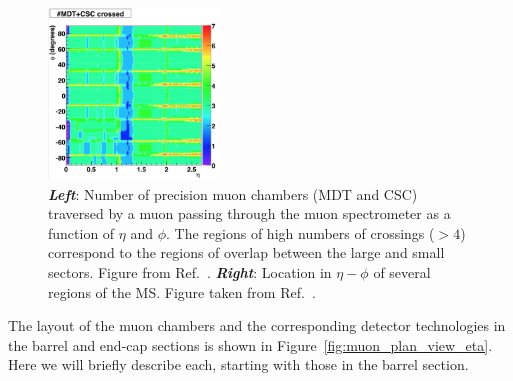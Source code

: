 \begin{figure}[!htb]
    \begin{center}
        \includegraphics[width=0.4\textwidth]{figures/chapter2/muon_spec/atlas_ms_nchamber_crossed}
        \caption{
            \textbf{\textit{Left}}: Number of precision muon chambers (MDT and CSC) traversed by a muon passing through the muon
                spectrometer as a function of $\eta$ and $\phi$.
                The regions of high numbers of crossings ($>4$) correspond to the regions of overlap
                between the large and small sectors.
                Figure from Ref.~\cite{ATL-PHYS-PUB-2009-008}.
            \textbf{\textit{Right}}: Location in $\eta-\phi$ of several regions of the MS. Figure taken from Ref.~\cite{Mete:1454661}.
        }
        \label{fig:muon_nchambers_crossed}
    \end{center}
\end{figure}
\FloatBarrier

The layout of the muon chambers and the corresponding detector technologies
in the barrel and end-cap sections is shown in Figure~\ref{fig:muon_plan_view_eta}.
Here we will briefly describe each, starting with those in the barrel section.

